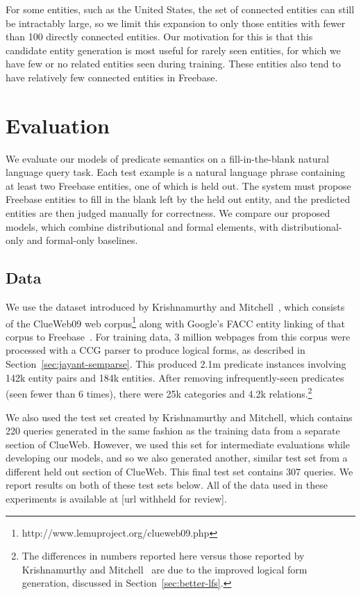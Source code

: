 \documentclass[11pt]{article}
\newcommand{\secref}[1]{Section~\ref{sec:#1}}
\begin{document}
For some entities, such as the United States, the set of connected entities can
still be intractably large, so we limit this expansion to only those entities
with fewer than 100 directly connected entities.  Our motivation for this is
that this candidate entity generation is most useful for rarely seen entities,
for which we have few or no related entities seen during training.  These
entities also tend to have relatively few connected entities in Freebase.

\section{Evaluation}
\label{sec:evaluation}

We evaluate our models of predicate semantics on a fill-in-the-blank natural
language query task.  Each test example is a natural language phrase containing
at least two Freebase entities, one of which is held out.  The system must
propose Freebase entities to fill in the blank left by the held out entity, and
the predicted entities are then judged manually for correctness.  We compare
our proposed models, which combine distributional and formal elements, with
distributional-only and formal-only baselines.

\subsection{Data}

We use the dataset introduced by Krishnamurthy and
Mitchell~, which
consists of the ClueWeb09 web
corpus\footnote{http://www.lemuproject.org/clueweb09.php} along with Google's
FACC entity linking of that corpus to
Freebase~\cite{gabrilovich-2013-clueweb-entity-linking}.  For training data, 3
million webpages from this corpus were processed with a CCG parser to produce
logical forms, as described in \secref{jayant-semparse}.  This produced 2.1m
predicate instances involving 142k entity pairs and 184k entities.  After
removing infrequently-seen predicates (seen fewer than 6 times), there were 25k
categories and 4.2k relations.\footnote{The differences in numbers reported
here versus those reported by Krishnamurthy and
Mitchell~ are due to the
improved logical form generation, discussed in \secref{better-lfs}.}

We also used the test set created by Krishnamurthy and Mitchell, which contains
220 queries generated in the same fashion as the training data from a separate
section of ClueWeb.  However, we used this set for intermediate evaluations
while developing our models, and so we also generated another, similar test set
from a different held out section of ClueWeb.  This final test set contains 307
queries.  We report results on both of these test sets below.  All of the data
used in these experiments is available at [url withheld for review].
\end{document}
